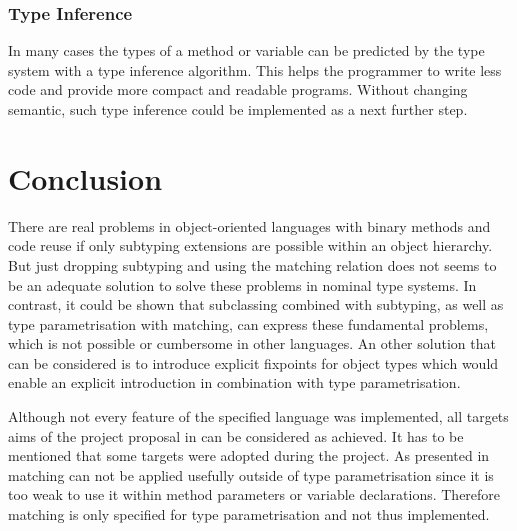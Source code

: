 \subsubsection{Type Inference}
In many cases the types of a method or variable can be predicted
by the type system with a type inference algorithm. This helps
the programmer to write less code and provide more compact and readable
programs. Without changing \ooplsss semantic, such type inference
could be implemented as a next further step.

\section{Conclusion}
\label{ctr:conclusion}
There are real problems in object-oriented languages with binary methods
and code reuse if only subtyping extensions are possible within an object
hierarchy. But just dropping subtyping and using the matching relation
does not seems to be an adequate solution to solve these problems in
nominal type systems. In contrast, it could be shown that subclassing
combined with subtyping, as well as type parametrisation with matching,
can express these fundamental problems, which is not possible or
cumbersome in other languages. An other solution that can be considered
is to introduce explicit fixpoints for object types which would enable
an explicit \mytype introduction in combination with type parametrisation.

Although not every feature of the specified language was implemented,
all targets aims of the project proposal in 
can be considered as achieved. It has to be mentioned that some targets
were adopted during the project. As presented in 
matching can not be applied usefully outside of type parametrisation
since it is too weak to use it within method parameters or variable
declarations.  Therefore matching is only specified for type
parametrisation and not thus implemented.
